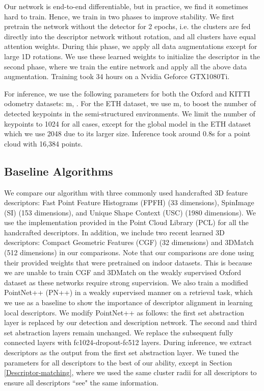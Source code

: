 \documentclass[runningheads]{llncs}
\begin{document}
Our network is end-to-end differentiable, but in practice, we find it sometimes hard to train. Hence, we train in two phases to improve stability. We first pretrain the network without the detector for 2 epochs, i.e. the clusters are fed directly into the descriptor network without rotation, and all clusters have equal attention weights. During this phase, we apply all data augmentations except for large 1D rotations. We use these learned weights to initialize the descriptor in the second phase, where we train the entire network and apply all the above data augmentation. Training took 34 hours on a Nvidia Geforce GTX1080Ti.

For inference, we use the following parameters for both the Oxford and KITTI odometry datasets: m, . For the ETH dataset, we use m,  to boost the number of detected keypoints in the semi-structured environments. We limit the number of keypoints  to 1024 for all cases, except for the global model in the ETH dataset which we use 2048 due to its larger size.  Inference took around 0.8s for a point cloud with 16,384 points.


\subsection{Baseline Algorithms}
We compare our algorithm with three commonly used handcrafted 3D feature descriptors: Fast Point Feature Histograms (FPFH) \cite{FPFH} (33 dimensions), SpinImage (SI) \cite{SpinImage} (153 dimensions), and Unique Shape Context (USC) \cite{USC} (1980 dimensions). We use the implementation provided in the Point Cloud Library (PCL) \cite{PCL} for all the handcrafted descriptors. 
In addition, we include two recent learned 3D descriptors: Compact Geometric Features (CGF) \cite{CGF} (32 dimensions) and 3DMatch \cite{zeng20163dmatch} (512 dimensions) in our comparisons. Note that our comparisons are done using their provided weights that were pretrained on indoor datasets. This is because we are unable to train CGF and 3DMatch on the weakly supervised Oxford dataset as these networks require strong supervision.
We also train a modified PointNet++ (PN++) \cite{pointnetpp} in a weakly supervised manner on a retrieval task, which we use as a baseline to show the importance of descriptor alignment in learning local descriptors. We modify PointNet++ as follows: the first set abstraction layer is replaced by our detection and description network. The second and third set abstraction layers remain unchanged. We replace the subsequent fully connected layers with fc1024-dropout-fc512 layers. During inference, we extract descriptors as the output from the first set abstraction layer. We tuned the parameters for all descriptors to the best of our ability, except in Section \ref{Descriptor-matching}, where we used the same cluster radii for all descriptors to ensure all descriptors ``see" the same information.
\end{document}

